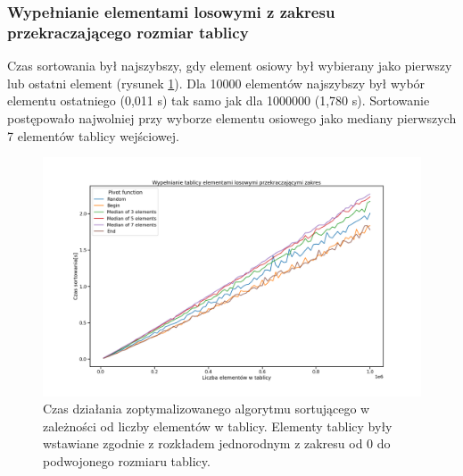 \documentclass{article}
\begin{document}
        \subsubsection{Wypełnianie elementami losowymi z zakresu przekraczającego rozmiar tablicy}
        Czas sortowania był najszybszy, gdy element osiowy był wybierany jako pierwszy lub ostatni element (rysunek \ref{fig:optimized:random_fill}). Dla 10000 elementów najszybszy był wybór elementu ostatniego (0,011 s) tak samo jak dla 1000000 (1,780 s). Sortowanie postępowało najwolniej przy wyborze elementu osiowego jako mediany pierwszych 7 elementów tablicy wejściowej.
        \begin{figure}
            \centering
            \includegraphics[width=\textwidth]{ryciny/optymalizacje/lineplot-random-fill.png}
            \caption{Czas działania zoptymalizowanego algorytmu sortującego w zależności od liczby elementów w tablicy. Elementy tablicy były wstawiane zgodnie z rozkładem jednorodnym z zakresu od 0 do podwojonego rozmiaru tablicy.}
            \label{fig:optimized:random_fill}
        \end{figure}
        
\end{document}
